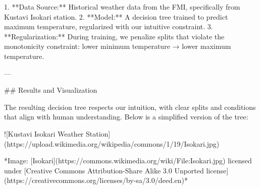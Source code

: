 1. **Data Source:** Historical weather data from the FMI, specifically from Kustavi Isokari station.
2. **Model:** A decision tree trained to predict maximum temperature, regularized with our intuitive constraint.
3. **Regularization:** During training, we penalize splits that violate the monotonicity constraint: lower minimum temperature → lower maximum temperature.

---

## Results and Visualization

The resulting decision tree respects our intuition, with clear splits and conditions that align with human understanding. Below is a simplified version of the tree:




![Kustavi Isokari Weather Station](https://upload.wikimedia.org/wikipedia/commons/1/19/Isokari.jpg)

*Image: [Isokari](https://commons.wikimedia.org/wiki/File:Isokari.jpg) licensed under [Creative Commons Attribution-Share Alike 3.0 Unported license](https://creativecommons.org/licenses/by-sa/3.0/deed.en)*

